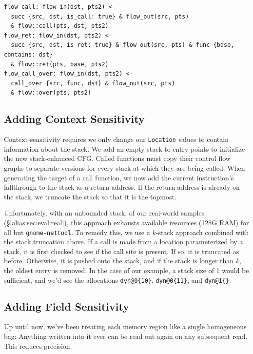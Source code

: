 \begin{lstlisting}[float=*t, caption={Inter-procedural Rules}, label=lst:interrules]
flow_call: flow_in(dst, pts2) <-
  succ {src, dst, is_call: true} & flow_out(src, pts)
  & flow::call(pts, dst, pts2)
flow_ret: flow_in(dst, pts2) <-
  succ {src, dst, is_ret: true} & flow_out(src, pts) & func {base, contains: dst}
  & flow::ret(pts, base, pts2)
flow_call_over: flow_in(dst, pts2) <-
  call_over {src, func, dst} & flow_out(src, pts)
  & flow::over(pts, pts2)
\end{lstlisting}





\subsection{Adding Context Sensitivity}
Context-sensitivity requires we only change our \texttt{Location}
values to contain information about the stack.
We add an empty stack to entry points to initialize the new stack-enhanced CFG.
Called functions must copy their control flow graphs to separate versions for every stack at which they are being called.
When generating the target of a call function, we now add the current instruction's fallthrough to the stack as a return address.
If the return address is already on the stack, we truncate the stack so that it is the topmost.

Unfortunately, with an unbounded stack, of our real-world samples (\S \ref{alias:sec:eval:real}), this approach exhausts available resources (128G RAM) for all but \texttt{gnome-nettool}.
To remedy this, we use a $k$-stack approach combined with the stack truncation above.
If a call is made from a location parameterized by a stack, it is first checked to see if the call site is present.
If so, it is truncated as before.
Otherwise, it is pushed onto the stack, and if the stack is longer than $k$, the oldest entry is removed.
In the case of our example, a stack size of 1 would be sufficient, and we'd see the allocations \texttt{dyn@0\{10\}}, \texttt{dyn@0\{11\}}, and \texttt{dyn@1\{\}}.

\subsection{Adding Field Sensitivity}
\label{sec:field}
Up until now, we've been treating each memory region like a single homogeneous bag:
Anything written into it ever can be read out again on any subsequent read.
This reduces precision.

